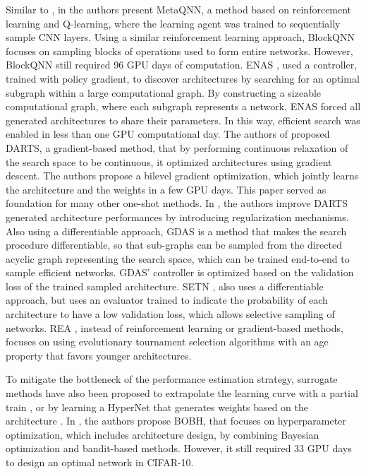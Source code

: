 \documentclass[10pt, conference]{IEEEtran}
\begin{document}
Similar to \cite{DBLP:conf/iclr/ZophL17}, in \cite{DBLP:conf/iclr/BakerGNR17} the authors present MetaQNN, a method based on reinforcement learning and Q-learning, where the learning agent was trained to sequentially sample CNN layers. Using a similar reinforcement learning approach, BlockQNN \cite{zhong2018practical} focuses on sampling blocks of operations used to form entire networks. However, BlockQNN still required 96 GPU days of computation. ENAS \cite{pham2018efficient}, used a controller, trained with policy gradient, to discover architectures by searching for an optimal subgraph within a large computational graph. By constructing a sizeable computational graph, where each subgraph represents a network, ENAS forced all generated architectures to share their parameters. In this way, efficient search was enabled in less than one GPU computational day. The authors of \cite{DBLP:conf/iclr/LiuSY19} proposed DARTS, a gradient-based method, that by performing continuous relaxation of the search space to be continuous, it optimized architectures using gradient descent. The authors propose a bilevel gradient optimization, which jointly learns the architecture and the weights in a few GPU days. This paper served as foundation for many other one-shot methods. In \cite{Zela2020Understanding}, the authors improve DARTS generated architecture performances by introducing regularization mechanisms. Also using a differentiable approach, GDAS \cite{dong2019searching} is a method that makes the search procedure differentiable, so that sub-graphs can be sampled from the directed acyclic graph representing the search space, which can be trained end-to-end to sample efficient networks. GDAS' controller is optimized based on the validation loss of the trained sampled architecture. SETN \cite{DBLP:conf/iccv/Dong019a}, also uses a differentiable approach, but uses an evaluator trained to indicate the probability of each architecture to have a low validation loss, which allows selective sampling of networks. REA \cite{DBLP:conf/aaai/RealAHL19}, instead of reinforcement learning or gradient-based methods, focuses on using evolutionary tournament selection algorithms with an age property that favors younger architectures.


To mitigate the bottleneck of the performance estimation strategy, surrogate methods have also been proposed to extrapolate the learning curve with a partial train \cite{domhan2015speeding,DBLP:conf/iclr/BakerGRN18}, or by learning a HyperNet that generates weights based on the architecture \cite{DBLP:conf/iclr/BrockLRW18}. In \cite{DBLP:conf/icml/FalknerKH18}, the authors propose BOBH, that focuses on hyperparameter optimization, which includes architecture design, by combining Bayesian optimization and bandit-based methods. However, it still required 33 GPU days to design an optimal network in CIFAR-10.
\end{document}

